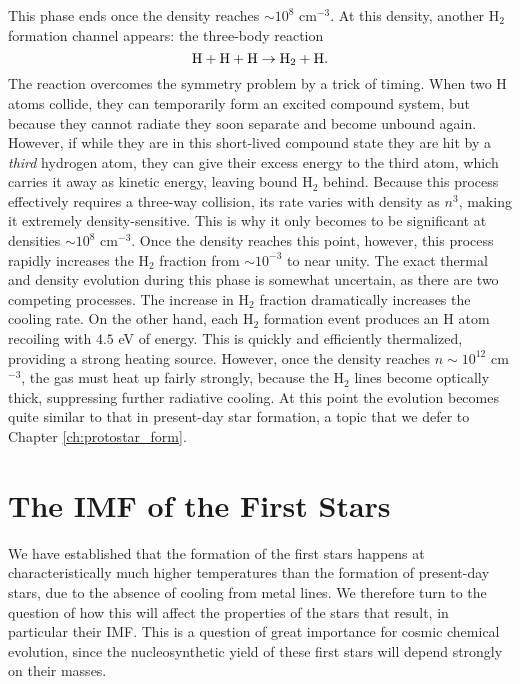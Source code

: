 This phase ends once the density reaches $\sim 10^8$ cm$^{-3}$. At this density, another H$_2$ formation channel appears: the three-body reaction
\begin{equation}
{\rm H} + {\rm H} + {\rm H} \rightarrow {\rm H}_2 + {\rm H}.
\end{equation}
The reaction overcomes the symmetry problem by a trick of timing. When two H atoms collide, they can temporarily form an excited compound system, but because they cannot radiate they soon separate and become unbound again. However, if while they are in this short-lived compound state they are hit by a \textit{third} hydrogen atom, they can give their excess energy to the third atom, which carries it away as kinetic energy, leaving bound H$_2$ behind. Because this process effectively requires a three-way collision, its rate varies with density as $n^3$, making it extremely density-sensitive. This is why it only becomes to be significant at densities $\sim 10^8$ cm$^{-3}$. Once the density reaches this point, however, this process rapidly increases the H$_2$ fraction from $\sim 10^{-3}$ to near unity. The exact thermal and density evolution during this phase is somewhat uncertain, as there are two competing processes. The increase in H$_2$ fraction dramatically increases the cooling rate. On the other hand, each H$_2$ formation event produces an H atom recoiling with $4.5$ eV of energy. This is quickly and efficiently thermalized, providing a strong heating source. However, once the density reaches $n\sim 10^{12}$ cm$^{-3}$, the gas must heat up fairly strongly, because the H$_2$ lines become optically thick, suppressing further radiative cooling. At this point the evolution becomes quite similar to that in present-day star formation, a topic that we defer to Chapter \ref{ch:protostar_form}.


\section{The IMF of the First Stars}

We have established that the formation of the first stars happens at characteristically much higher temperatures than the formation of present-day stars, due to the absence of cooling from metal lines. We therefore turn to the question of how this will affect the properties of the stars that result, in particular their IMF. This is a question of great importance for cosmic chemical evolution, since the nucleosynthetic yield of these first stars will depend strongly on their masses.


